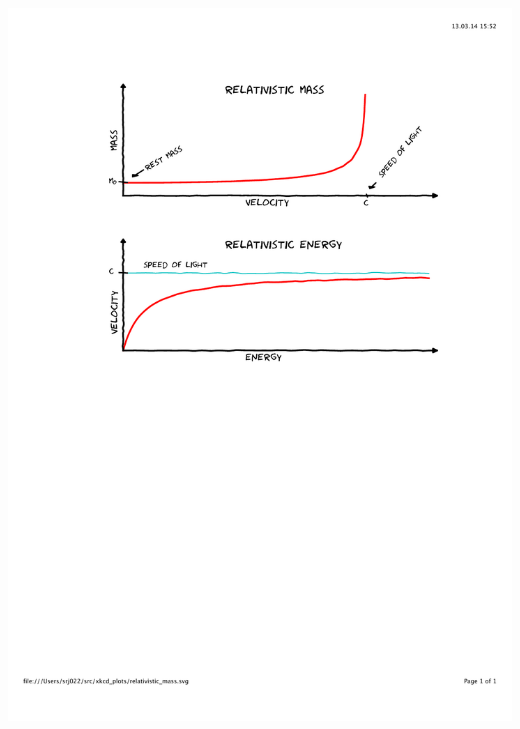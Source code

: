 \documentclass[mathserif,8pt]{beamer}
\begin{document}
\begin{frame}
\begin{columns}
\begin{column}{.70\textwidth}
	\includegraphics[viewport = 100 400 520 760, clip, scale=0.4]{figures/mass_and_energy.pdf}\\
    \end{column}
    \end{columns}
\end{frame}
\end{document}
